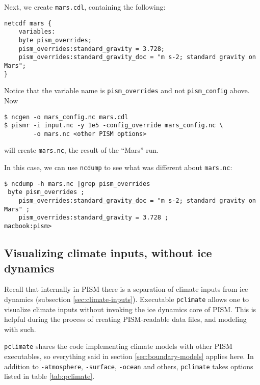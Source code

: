 Next, we create \texttt{mars.cdl}, containing the following:
\small
\begin{verbatim}
netcdf mars {
    variables:
    byte pism_overrides;
    pism_overrides:standard_gravity = 3.728;
    pism_overrides:standard_gravity_doc = "m s-2; standard gravity on Mars";
}
\end{verbatim}
\normalsize
Notice that the variable name is \texttt{pism_overrides} and not \texttt{pism_config} above. Now
\begin{verbatim}
$ ncgen -o mars_config.nc mars.cdl
$ pismr -i input.nc -y 1e5 -config_override mars_config.nc \
        -o mars.nc <other PISM options>
\end{verbatim}
will create \texttt{mars.nc}, the result of the ``Mars'' run.

In this case, we can use \texttt{ncdump} to see what was different about \texttt{mars.nc}:
\small
\begin{verbatim}
$ ncdump -h mars.nc |grep pism_overrides
 byte pism_overrides ;
    pism_overrides:standard_gravity_doc = "m s-2; standard gravity on Mars" ;
    pism_overrides:standard_gravity = 3.728 ;
macbook:pism>
\end{verbatim}
\normalsize


\subsection{Visualizing climate inputs, without ice dynamics}
\label{subsect:pclimate}

Recall that internally in PISM there is a separation of climate inputs from ice
dynamics (subsection \ref{sec:climate-inputs}). Executable
\texttt{pclimate}  allows one to visualize climate inputs without
invoking the ice dynamics core of PISM. This is helpful during the process of
creating PISM-readable data files, and modeling with such.

\texttt{pclimate} shares the code implementing climate models with other PISM
executables, so everything said in section \ref{sec:boundary-models} applies
here. In addition to \texttt{-atmosphere}, \texttt{-surface}, \texttt{-ocean}
and others, \texttt{pclimate} takes options listed in table \ref{tab:pclimate}.


